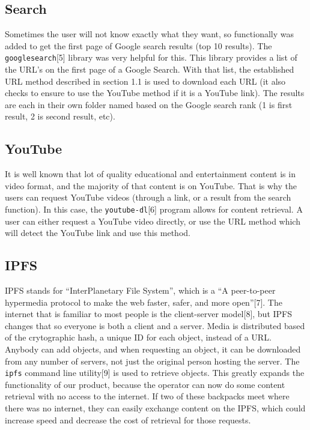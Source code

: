 \documentclass{article}
\begin{document}
\subsection{Search}

Sometimes the user will not know exactly what they want, so
functionally was added to get the first page of Google search results (top 10
results). The \texttt{googlesearch}[5] library was very helpful for
this. This library provides a list of the URL's on the first page of a
Google Search. With that list, the established URL method described in
section 1.1 is used
to download each URL (it also checks to ensure to use the YouTube method
if it is a YouTube link).
The results are each in their own folder named
based on the Google search rank (1 is first result, 2 is second
result, etc). 

\subsection{YouTube}

It is well known that lot of quality educational and entertainment
content is in video format, and the majority of that content is on
YouTube. That is why the users can request YouTube
videos (through a link, or a result from the search function). In this
case, the \texttt{youtube-dl}[6] program allows for content retrieval. A
user can either request a YouTube video directly, or use the URL
method which will detect the YouTube link and use this method.

\subsection{IPFS}
IPFS stands for ``InterPlanetary File System'', which is a ``A
peer-to-peer hypermedia protocol to make the web faster, safer, and
more open''[7]. The internet that is familiar to most people is the
client-server model[8], but IPFS changes that so everyone is both a
client and a server. Media is distributed based of the crytographic
hash, a unique ID for each object, instead of a URL. Anybody can add
objects, and when requesting an object, it can be downloaded from any
number of servers, not just the original person hosting the
server. The \texttt{ipfs} command line utility[9] is used to retrieve
objects. This greatly expands the functionality of our product,
because the operator can now do some content retrieval with no access to the
internet. If two of these backpacks meet where there was no internet,
they can easily exchange content on the IPFS, which could increase
speed and decrease the cost of retrieval for those requests.
\end{document}
